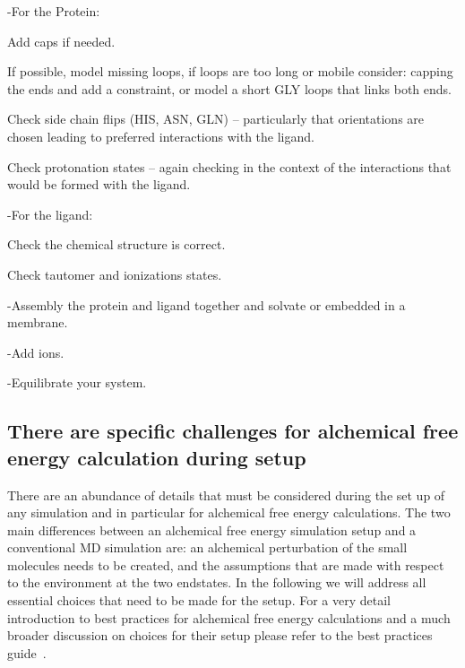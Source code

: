 \documentclass[9pt,bestpractices]{livecoms}
\begin{document}
-For the Protein: 

	Add caps if needed.
    
	If possible, model missing loops, if loops are too long or mobile consider: capping the ends and add a constraint, or model a short GLY loops that links both ends.
    
	Check side chain flips (HIS, ASN, GLN) – particularly that orientations are chosen leading to preferred interactions with the ligand.
    
	Check protonation states – again checking in the context of the interactions that would be formed with the ligand.
    
-For the ligand:

	Check the chemical structure is correct.
  
	Check tautomer and ionizations states.
    
-Assembly the protein and ligand together and solvate or embedded in a membrane. 

-Add ions.

-Equilibrate your system. 


\subsection{There are specific challenges for alchemical free energy calculation during setup}
\label{sec:alchemical_prep}

There are an abundance of details that must be considered during the set up of any simulation and in particular for alchemical free energy calculations. The two main differences between an alchemical free energy simulation setup and a conventional MD simulation are: an alchemical perturbation of the small molecules needs to be created, and the assumptions that are made with respect to the environment at the two endstates. In the following we will address all essential choices that need to be made for the setup. For a very detail introduction to best practices for alchemical free energy calculations and a much broader discussion on choices for their setup please refer to the best practices guide~\cite{mey2020best}. 
\end{document}
